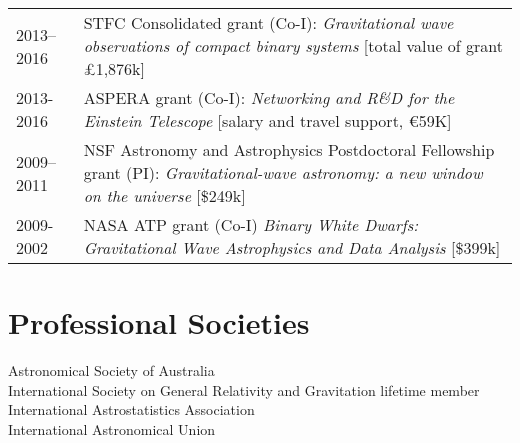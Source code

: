 \documentclass[margin,line]{res}
\begin{document}
\begin{resume}
\begin{tabular}{@{}p{0.8in}p{4.7in}}
2013--2016 & STFC Consolidated grant (Co-I): {\it Gravitational wave observations of compact binary systems} [total value of grant \pounds1,876k]\\
2013-2016 & ASPERA grant (Co-I): {\it Networking and R\&D for the Einstein Telescope} [salary and travel support, \euro59K]\\
2009--2011 & NSF Astronomy and Astrophysics Postdoctoral Fellowship grant (PI):  {\it Gravitational-wave astronomy: a new window on the universe} [\$249k]\\
2009-2002 & NASA ATP grant (Co-I) {\it Binary White Dwarfs: Gravitational Wave Astrophysics and Data Analysis} [\$399k]\\
\end{tabular}





\section{\sc Professional Societies}
Astronomical Society of Australia\\
International Society on General Relativity and Gravitation lifetime member\\
International Astrostatistics Association\\
International Astronomical Union



\end{resume}
\end{document}
